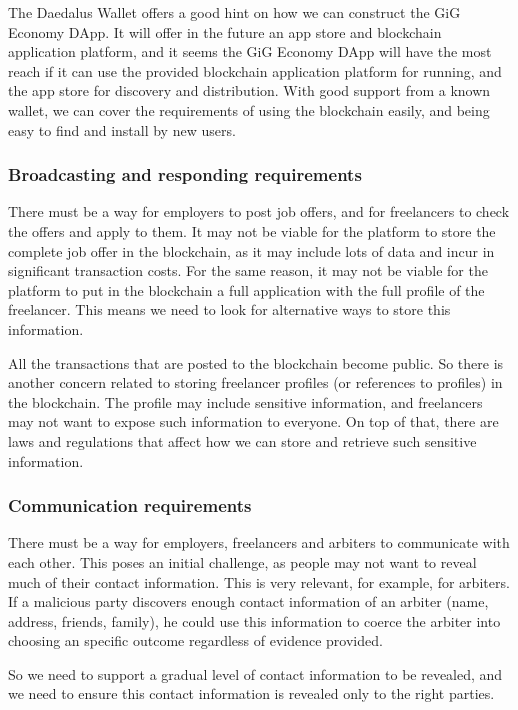 \documentclass{article}
\begin{document}
The Daedalus Wallet offers a good hint on how we can construct the GiG Economy DApp. It will offer in the future an app store and blockchain application platform, and it seems the GiG Economy DApp will have the most reach if it can use the provided blockchain application platform for running, and the app store for discovery and distribution. With good support from a known wallet, we can cover the requirements of using the blockchain easily, and being easy to find and install by new users.


\subsubsection{Broadcasting and responding requirements}

There must be a way for employers to post job offers, and for freelancers to check the offers and apply to them. It may not be viable for the platform to store the complete job offer in the blockchain, as it may include lots of data and incur in significant transaction costs. For the same reason, it may not be viable for the platform to put in the blockchain a full application with the full profile of the freelancer. This means we need to look for alternative ways to store this information.

All the transactions that are posted to the blockchain become public. So there is another concern related to storing freelancer profiles (or references to profiles) in the blockchain. The profile may include sensitive information, and freelancers may not want to expose such information to everyone. On top of that, there are laws and regulations that affect how we can store and retrieve such sensitive information.

\subsubsection{Communication requirements}

There must be a way for employers, freelancers and arbiters to communicate with each other. This poses an initial challenge, as people may not want to reveal much of their contact information. This is very relevant, for example, for arbiters. If a malicious party discovers enough contact information of an arbiter (name, address, friends, family), he could use this information to coerce the arbiter into choosing an specific outcome regardless of evidence provided.

So we need to support a gradual level of contact information to be revealed, and we need to ensure this contact information is revealed only to the right parties.
\end{document}
